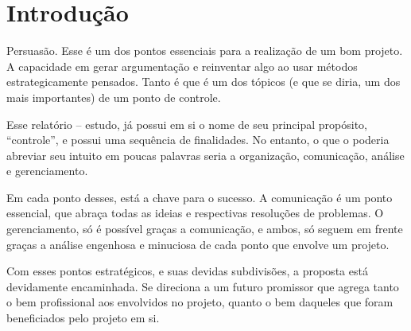\chapter[Introdução]{Introdução}

Persuasão. Esse é um dos pontos essenciais para a realização de um bom projeto. A capacidade em gerar argumentação e reinventar algo ao usar métodos estrategicamente pensados. Tanto é que é um dos tópicos (e que se diria, um dos mais importantes) de um ponto de controle.

Esse relatório – estudo, já possui em si o nome de seu principal propósito, “controle”, e possui uma sequência de finalidades. No entanto, o que o poderia abreviar seu intuito em poucas palavras seria a organização, comunicação, análise e gerenciamento.

Em cada ponto desses, está a chave para o sucesso. A comunicação é um ponto essencial, que abraça todas as ideias e respectivas resoluções de problemas.  O gerenciamento, só é possível graças a comunicação, e ambos, só seguem em frente graças a análise engenhosa e minuciosa de cada ponto que envolve um projeto.  

Com esses pontos estratégicos, e suas devidas subdivisões, a proposta está devidamente encaminhada.  Se direciona a um futuro promissor que agrega tanto o bem profissional aos envolvidos no projeto, quanto o bem daqueles que foram beneficiados pelo projeto em si.